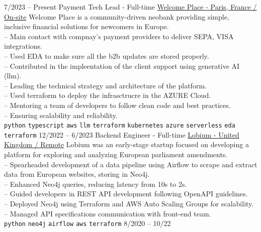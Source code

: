 \documentclass[9pt]{developercv}
\begin{document}
\begin{entrylist}
	\entry
	{7/2023 -- Present}
	{Payment Tech Lead - Full-time}
	{
		\href{https://www.linkedin.com/company/welcome-place/}{Welcome Place - Paris, France / On-site}}
	{
		Welcome Place is a community-driven neobank providing simple, inclusive financial solutions for newcomers in Europe. \\
		-- Main contact with compnay's payment providers to deliver SEPA, VISA integrations.\\
		-- Used EDA to make sure all the b2b updates are stored properly.\\
		-- Contributed in the impleentation of the client support using generative AI (llm).\\
		-- Leading the technical strategy and architecture of the platform. \\
		-- Used terraform to deploy the infrasctrucre in the AZURE Cloud. \\
		-- Mentoring a team of developers to follow clean code and best practices. \\
		-- Ensuring scalability and reliability. \\
		\texttt{python}\slashsep
		\texttt{typescript}\slashsep
		\texttt{aws}\slashsep
		\texttt{llm}\slashsep
		\texttt{terraform}\slashsep
		\texttt{kubernetes}\slashsep
		\texttt{azure}\slashsep
		\texttt{serverless}\slashsep
		\texttt{eda}\slashsep
		\texttt{terraform}\slashsep
	}
		\entry
	{12/2022 -- 6/2023}
	{Backend Engineer - Full-time}
	{
		\href{https://www.linkedin.com/company/lobium/}{Lobium - United Kingdom / Remote}}
	{
		Lobium was an early-stage startup focused on developing a platform for exploring and analyzing European parliament amendments. \\
		-- Spearheaded development of a data pipeline using Airflow to scrape and extract data from European websites, storing in Neo4j. \\
		-- Enhanced Neo4j queries, reducing latency from 10s to 2s. \\
		-- Guided developers in REST API development following OpenAPI guidelines. \\
		-- Deployed Neo4j using Terraform and AWS Auto Scaling Groups for scalability. \\
		-- Managed API specifications communication with front-end team. \\
		\texttt{python}\slashsep
		\texttt{neo4j}\slashsep
		\texttt{airflow}\slashsep
		\texttt{aws}\slashsep
		\texttt{terraform}
	}
	\entry
	{8/2020 -- 10/22}

\end{entrylist}
\end{document}
